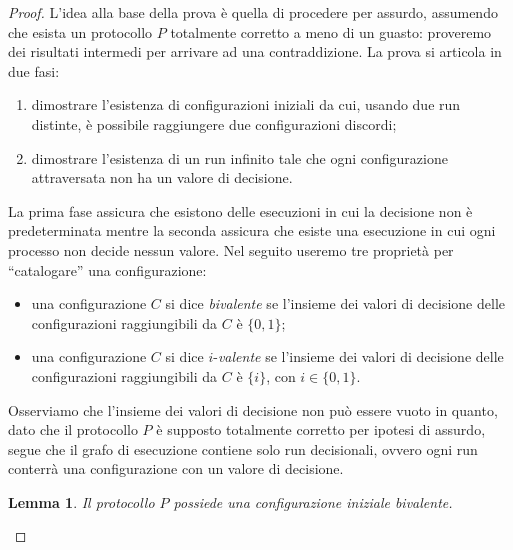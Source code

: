 \documentclass{article}
\newtheorem{lemma}{Lemma}
\begin{document}
\begin{proof}
  L'idea alla base della prova è quella di procedere per assurdo,
  assumendo che esista un protocollo $P$ totalmente corretto a meno di
  un guasto: proveremo dei risultati intermedi per arrivare ad una
  contraddizione. La prova si articola in due fasi:
  \begin{enumerate}
  \item dimostrare l'esistenza di configurazioni iniziali da cui,
    usando due run distinte, è possibile raggiungere due
    configurazioni discordi;
  \item dimostrare l'esistenza di un run infinito tale che ogni
    configurazione attraversata non ha un valore di decisione.
  \end{enumerate}
  La prima fase assicura che esistono delle esecuzioni in cui la
  decisione non è predeterminata mentre la seconda assicura che esiste
  una esecuzione in cui ogni processo non decide nessun valore.  Nel
  seguito useremo tre propriet\`a per ``catalogare'' una
  configurazione:
  \begin{itemize}
  \item una configurazione $C$ si dice \emph{bivalente} se l'insieme
    dei valori di decisione delle configurazioni raggiungibili da $C$
    è $\{0,1\}$;
  \item una configurazione $C$ si dice ${i}$-\emph{valente} se
    l'insieme dei valori di decisione delle configurazioni
    raggiungibili da $C$ è $\{i\}$, con $i\in \lbrace 0, 1 \rbrace$.
  \end{itemize}

  Osserviamo che l'insieme dei valori di decisione non può essere
  vuoto in quanto, dato che il protocollo $P$ è supposto totalmente
  corretto per ipotesi di assurdo, segue che il grafo di esecuzione
  contiene solo run decisionali, ovvero ogni run conterrà una
  configurazione con un valore di decisione.

\begin{lemma}
Il protocollo $P$ possiede una configurazione iniziale bivalente.
\end{lemma}


\end{proof}
\end{document}

